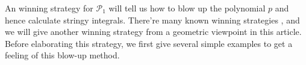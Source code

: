 \documentclass[12pt]{article}
\theoremstyle{definition}
\theoremstyle{plain}
\begin{document}

An winning strategy for $\mathcal{P}_{1}$ will tell us how to blow up the polynomial $p$ and hence calculate stringy integrals. There're many known winning strategies \cite{spivakovsky1983solution,zeillinger2006short,hauser2003hironaka}, and we will give another winning strategy from a geometric viewpoint in this article. Before elaborating this strategy, we first give several simple examples to get a feeling of this blow-up method.


% 
% 
% 
\end{document}
